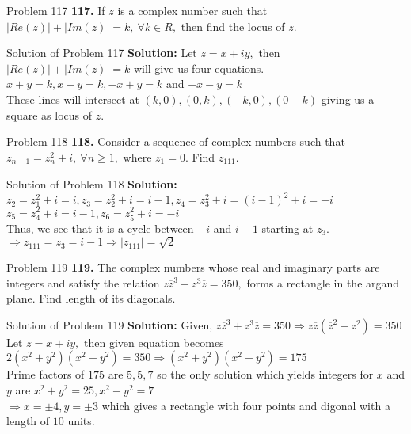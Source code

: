 \documentclass[aspectratio=169,8pt]{beamer}
\begin{document}
\begin{frame}{Problem 117}
  \textbf{117.} If $z$ is a complex number such that $|Re(z)| + |Im(z)| = k,~\forall k\in R,$ then find the locus of $z.$
\end{frame}
\begin{frame}{Solution of Problem 117}
  \textbf{Solution:} Let $z = x + iy,$ then $|Re(z)| + |Im(z)| = k$ will give us four equations.\\
  \vspace*{0.2cm}
  $x + y = k, x - y = k, -x + y = k$ and $-x - y = k$\\
  \vspace*{0.2cm}
  These lines will intersect at $(k, 0), (0, k), (-k, 0), (0 -k)$ giving us a square as locus of $z.$
\end{frame}
\begin{frame}{Problem 118}
  \textbf{118.} Consider a sequence of complex numbers such that $z_{n + 1} = z_n^2 + i,~\forall n\geq 1,$ where $z_1 = 0.$ Find $z_{111}.$
\end{frame}
\begin{frame}{Solution of Problem 118}
  \textbf{Solution:} $z_2 = z_1^2 + i = i, z_3 = z_2^2 + i = i - 1, z_4 = z_3^2 + i = (i - 1)^2 + i = -i$\\
  \vspace*{0.2cm}
  $z_5 = z_4^2 + i = i - 1, z_6 = z_5^2 + i = -i$\\
  \vspace*{0.2cm}
  Thus, we see that it is a cycle between $-i$ and $i - 1$ starting at $z_3.$\\
  \vspace*{0.2cm}
  $\Rightarrow z_{111} = z_3 = i - 1 \Rightarrow |z_{111}| = \sqrt{2}$
\end{frame}
\begin{frame}{Problem 119}
  \textbf{119.} The complex numbers whose real and imaginary parts are integers and satisfy the relation $z\overline{z}^3 +
  z^3\overline{z} = 350,$ forms a rectangle in the argand plane. Find length of its diagonals.
\end{frame}
\begin{frame}{Solution of Problem 119}
  \textbf{Solution:} Given, $z\overline{z}^3 + z^3\overline{z} = 350 \Rightarrow z\overline{z}(\overline{z}^2 + z^2) = 350$\\
  \vspace*{0.2cm}
  Let $z = x + iy,$ then given equation becomes $2(x^2 + y^2)(x^2 - y^2) = 350 \Rightarrow (x^2 + y^2)(x^2 - y^2) = 175$\\
  \vspace*{0.2cm}
  Prime factors of $175$ are $5, 5, 7$ so the only solution which yields integers for $x$ and $y$ are $x^2 + y^2 = 25, x^2-y^2 =
  7$\\
  \vspace*{0.2cm}
  $\Rightarrow x = \pm 4, y = \pm 3$ which gives a rectangle with four points and digonal with a length of $10$ units.
\end{frame}
\end{document}
